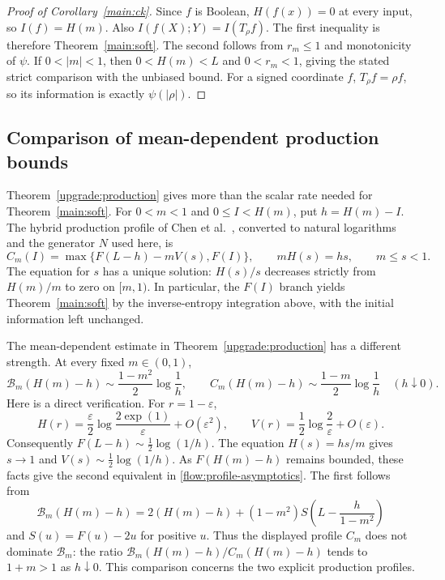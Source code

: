 \begin{proof}[Proof of Corollary~\ref{main:ck}]
Since $f$ is Boolean, $H(f(x))=0$ at every input, so
$I(f)=H(m)$.  Also $I(f(X);Y)=I(T_\rho f)$.  The first
inequality is therefore Theorem~\ref{main:soft}.
The second follows from $r_m\le1$ and monotonicity of $\psi$.
If $0<|m|<1$, then $0<H(m)<L$ and $0<r_m<1$, giving the
stated strict comparison with the unbiased bound.
For a signed coordinate $f$, $T_\rho f=\rho f$, so its
information is exactly $\psi(|\rho|)$.
\end{proof}

\subsection{Comparison of mean-dependent production bounds}
\label{flow:comparison}

Theorem~\ref{upgrade:production} gives more than the scalar rate needed
for Theorem~\ref{main:soft}. For $0<m<1$ and $0\le I<H(m)$, put
$h=H(m)-I$. The hybrid production profile of
Chen et al.\ \cite[Section~9 and Lemma~9.2]{ChenEtAl2026CK}, converted
to natural logarithms and the generator $N$ used here, is
\[
 C_m(I)=\max\{F(L-h)-mV(s),F(I)\},\qquad mH(s)=hs,
 \qquad m\le s<1.
\]
The equation for $s$ has a unique solution: $H(s)/s$ decreases
strictly from $H(m)/m$ to zero on $[m,1)$. In particular, the
$F(I)$ branch yields Theorem~\ref{main:soft} by the inverse-entropy
integration above, with the initial information left unchanged.

The mean-dependent estimate in Theorem~\ref{upgrade:production}
has a different strength. At every fixed $m\in(0,1)$,
\begin{equation}
 \mathcal B_m(H(m)-h)\sim\frac{1-m^2}{2}\log\frac1h,
 \qquad C_m(H(m)-h)\sim\frac{1-m}{2}\log\frac1h
 \quad(h\downarrow0).
 \label{flow:profile-asymptotics}
\end{equation}
Here is a direct verification. For $r=1-\varepsilon$,
\[
 H(r)=\frac\varepsilon2\log\frac{2\exp(1)}{\varepsilon}
       +O(\varepsilon^2),\qquad
 V(r)=\frac12\log\frac2\varepsilon+O(\varepsilon).
\]
Consequently $F(L-h)\sim\tfrac12\log(1/h)$.
The equation $H(s)=hs/m$ gives $s\to1$ and
$V(s)\sim\tfrac12\log(1/h)$. As $F(H(m)-h)$ remains bounded,
these facts give the second equivalent in
\eqref{flow:profile-asymptotics}. The first follows from
\[
 \mathcal B_m(H(m)-h)
 =2(H(m)-h)+(1-m^2)S\left(L-\frac h{1-m^2}\right)
\]
and $S(u)=F(u)-2u$ for positive $u$.
Thus the displayed profile $C_m$ does not dominate
$\mathcal B_m$: the ratio $\mathcal B_m(H(m)-h)/C_m(H(m)-h)$
tends to $1+m>1$ as $h\downarrow0$.
This comparison concerns the two explicit production profiles.
